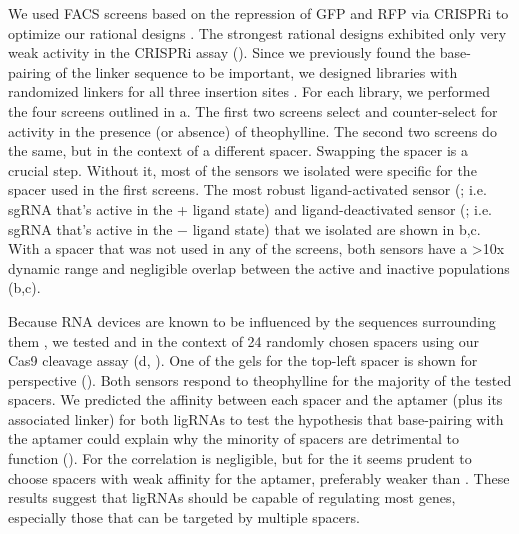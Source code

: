 \documentclass[10pt,oneside]{article}
\begin{document}

We used FACS screens based on the repression of GFP and RFP via CRISPRi to optimize our rational designs \invivo{}.  The strongest rational designs exhibited only very weak activity in the CRISPRi assay ().  Since we previously found the base-pairing of the linker sequence to be important, we designed libraries with randomized linkers for all three insertion sites .  For each library, we performed the four screens outlined in a.  The first two screens select and counter-select for activity in the presence (or absence) of theophylline.  The second two screens do the same, but in the context of a different spacer.  Swapping the spacer is a crucial step.  Without it, most of the sensors we isolated were specific for the spacer used in the first screens.  The most robust ligand-activated sensor (\ligrnaF{}; i.e. sgRNA that's active in the + ligand state) and ligand-deactivated sensor (\ligrnaB{}; i.e. sgRNA that's active in the − ligand state) that we isolated are shown in b,c.  With a spacer that was not used in any of the screens, both sensors have a >10x dynamic range and negligible overlap between the active and inactive populations (b,c).


Because RNA devices are known to be influenced by the sequences surrounding them \autocite{liang2012}, we tested \ligrnaF{} and \ligrnaB{} in the context of 24 randomly chosen spacers using our \invitro{} Cas9 cleavage assay (d, ).  One of the gels for the top-left spacer is shown for perspective ().  Both sensors respond to theophylline for the majority of the tested spacers.  We predicted the affinity between each spacer and the aptamer (plus its associated linker) for both ligRNAs to test the hypothesis that base-pairing with the aptamer could explain why the minority of spacers are detrimental to function ().  For \ligrnaF{} the correlation is negligible, but for the \ligrnaB{} it seems prudent to choose spacers with weak affinity for the aptamer, preferably weaker than .  These results suggest that ligRNAs should be capable of regulating most genes, especially those that can be targeted by multiple spacers.
\end{document}
